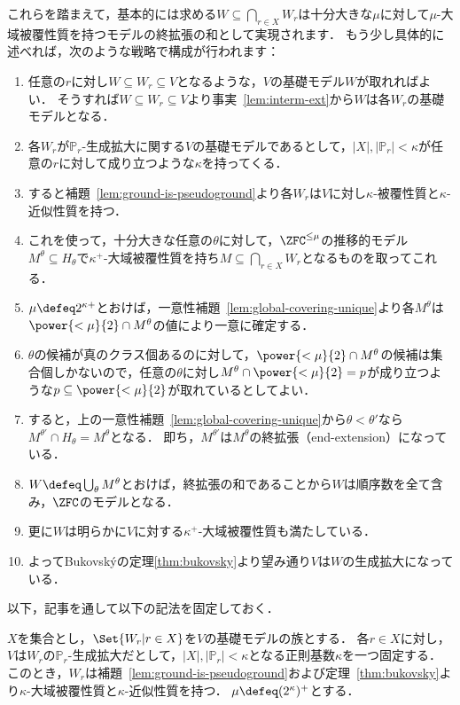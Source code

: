 \documentclass[a4j,leqno]{ltjsarticle}
\begin{document}
これらを踏まえて，基本的には求める$W \subseteq \bigcap_{r \in X} W_r$は十分大きな$\mu$に対して$\mu$-大域被覆性質を持つモデルの終拡張の和として実現されます．
もう少し具体的に述べれば，次のような戦略で構成が行われます：
\begin{enumerate}
 \item 任意の$r$に対し$W \subseteq W_r \subseteq V$となるような，$V$の基礎モデル$W$が取れればよい．
       そうすれば$W \subseteq W_r \subseteq V$より事実~\ref{lem:interm-ext}から$W$は各$W_r$の基礎モデルとなる．
 \item 各$W_r$が$\mathbb{P}_r$-生成拡大に関する$V$の基礎モデルであるとして，$|X|, |\mathbb{P}_r| < \kappa$が任意の$r$に対して成り立つような$\kappa$を持ってくる．
 \item すると補題~\ref{lem:ground-is-pseudoground}より各$W_r$は$V$に対し$\kappa$-被覆性質と$\kappa$-近似性質を持つ．
 \item\label{item:glob-cov-submod-many} これを使って，十分大きな任意の$\theta$に対して，$\ZFC^{\leq\mu}$の推移的モデル$M^\theta \subseteq H_\theta$で$\kappa^+$-大域被覆性質を持ち$M \subseteq \bigcap_{r \in X} W_r$となるものを取ってこれる．
 \item $\mu \defeq 2^{\kappa+}$とおけば，一意性補題~\ref{lem:global-covering-unique}より各$M^\theta$は$\power{<\mu}{2} \cap M^\theta$の値により一意に確定する．
 \item $\theta$の候補が真のクラス個あるのに対して，$\power{<\mu}{2} \cap M^\theta$の候補は集合個しかないので，任意の$\theta$に対し$M^\theta \cap \power{<\mu}{2} = p$が成り立つような$p \subseteq \power{<\mu}{2}$が取れているとしてよい．
 \item すると，上の一意性補題~\ref{lem:global-covering-unique}から$\theta < \theta'$なら$M^{\theta'} \cap H_\theta = M^\theta$となる．
       即ち，$M^{\theta'}$は$M^\theta$の終拡張（end-extension）になっている．
 \item $W \defeq \bigcup_\theta M^\theta$とおけば，終拡張の和であることから$W$は順序数を全て含み，$\ZFC$のモデルとなる．
 \item 更に$W$は明らかに$V$に対する$\kappa^+$-大域被覆性質も満たしている．
 \item よってBukovsk\'{y}の定理\ref{thm:bukovsky}より望み通り$V$は$W$の生成拡大になっている．
\end{enumerate}

以下，記事を通して以下の記法を固定しておく．

\begin{notation}
 $X$を集合とし，$\Set{W_r | r \in X}$を$V$の基礎モデルの族とする．
 各$r \in X$に対し，$V$は$W_r$の$\mathbb{P}_r$-生成拡大だとして，$|X|, |\mathbb{P}_r| < \kappa$となる正則基数$\kappa$を一つ固定する．
 このとき，$W_r$は補題~\ref{lem:ground-is-pseudoground}および定理~\ref{thm:bukovsky}より$\kappa$-大域被覆性質と$\kappa$-近似性質を持つ．
 $\mu \defeq (2^{\kappa})^{+}$とする．
\end{notation}
\end{document}
